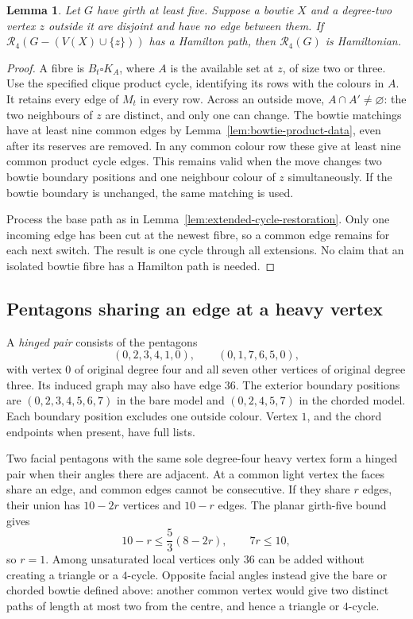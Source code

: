 \documentclass[11pt]{article}
\newtheorem{lemma}[theorem]{Lemma}
\theoremstyle{remark}
\newcommand{\R}{\mathcal R}
\numberwithin{equation}{section}
\numberwithin{table}{section}
\begin{document}
\begin{lemma}\label{lem:bowtie-degree-two}
Let $G$ have girth at least five. Suppose a bowtie $X$ and a degree-two
vertex $z$ outside it are disjoint and have no edge between them. If
$\R_4(G-(V(X)\cup\{z\}))$ has a Hamilton path, then $\R_4(G)$ is
Hamiltonian.
\end{lemma}
\begin{proof}
A fibre is $B_t\square K_A$, where $A$ is the available set at $z$,
of size two or three. Use the specified clique product cycle, identifying its
rows with the colours in $A$. It retains every edge of $M_t$
in every row. Across an outside move, $A\cap A'\ne\varnothing$:
the two neighbours of $z$ are distinct, and only one can change.
The bowtie matchings have at least nine common edges by
Lemma~\ref{lem:bowtie-product-data}, even after its reserves are
removed. In any common colour row these give at least nine common
product cycle edges. This remains valid when the move changes two bowtie
boundary positions and one neighbour colour of $z$ simultaneously. If the bowtie
boundary is unchanged, the same matching is used.

Process the base path as in
Lemma~\ref{lem:extended-cycle-restoration}. Only one incoming edge
has been cut at the newest fibre, so a common edge remains for each
next switch. The result is one cycle through all extensions. No
claim that an isolated bowtie fibre has a Hamilton path is needed.
\end{proof}


\subsection{Pentagons sharing an edge at a heavy vertex}
A \emph{hinged pair} consists of the pentagons
\[
 (0,2,3,4,1,0),\qquad (0,1,7,6,5,0),
\]
with vertex $0$ of original degree four and all seven other vertices
of original degree three. Its induced graph may also have edge $36$.
The exterior boundary positions are $(0,2,3,4,5,6,7)$ in the bare model and
$(0,2,4,5,7)$ in the chorded model. Each boundary position excludes one outside
colour. Vertex $1$, and the chord endpoints when present, have full lists.

Two facial pentagons with the same sole degree-four heavy vertex
form a hinged pair when their angles there are adjacent. At a common
light vertex the faces share an edge, and common edges cannot be
consecutive. If they share $r$ edges, their union has $10-2r$ vertices
and $10-r$ edges. The planar girth-five bound gives
\[
 10-r\le\frac53(8-2r),\qquad 7r\le10,
\]
so $r=1$. Among unsaturated local vertices only $36$ can be added
without creating a triangle or a $4$-cycle. Opposite facial angles
instead give the bare or chorded bowtie defined above: another common
vertex would give two distinct paths of length at most two from the
centre, and hence a triangle or $4$-cycle.
\end{document}
